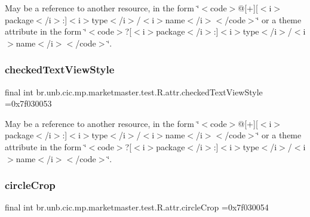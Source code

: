 May be a reference to another resource, in the form \char`\"{}$<$code$>$@\mbox{[}+\mbox{]}\mbox{[}$<$i$>$package$<$/i$>$\+:\mbox{]}$<$i$>$type$<$/i$>$/$<$i$>$name$<$/i$>$$<$/code$>$\char`\"{} or a theme attribute in the form \char`\"{}$<$code$>$?\mbox{[}$<$i$>$package$<$/i$>$\+:\mbox{]}$<$i$>$type$<$/i$>$/$<$i$>$name$<$/i$>$$<$/code$>$\char`\"{}. \mbox{\label{classbr_1_1unb_1_1cic_1_1mp_1_1marketmaster_1_1test_1_1R_1_1attr_a86ce9ec0b57e28124f72bf027e60e971}} 
\subsubsection{\texorpdfstring{checked\+Text\+View\+Style}{checkedTextViewStyle}}
{\footnotesize\ttfamily final int br.\+unb.\+cic.\+mp.\+marketmaster.\+test.\+R.\+attr.\+checked\+Text\+View\+Style =0x7f030053\hspace{0.3cm}{\ttfamily [static]}}

May be a reference to another resource, in the form \char`\"{}$<$code$>$@\mbox{[}+\mbox{]}\mbox{[}$<$i$>$package$<$/i$>$\+:\mbox{]}$<$i$>$type$<$/i$>$/$<$i$>$name$<$/i$>$$<$/code$>$\char`\"{} or a theme attribute in the form \char`\"{}$<$code$>$?\mbox{[}$<$i$>$package$<$/i$>$\+:\mbox{]}$<$i$>$type$<$/i$>$/$<$i$>$name$<$/i$>$$<$/code$>$\char`\"{}. \mbox{\label{classbr_1_1unb_1_1cic_1_1mp_1_1marketmaster_1_1test_1_1R_1_1attr_a39e65112dea99f9a1b03fd0c1dfa9756}} 
\subsubsection{\texorpdfstring{circle\+Crop}{circleCrop}}
{\footnotesize\ttfamily final int br.\+unb.\+cic.\+mp.\+marketmaster.\+test.\+R.\+attr.\+circle\+Crop =0x7f030054\hspace{0.3cm}{\ttfamily [static]}}


